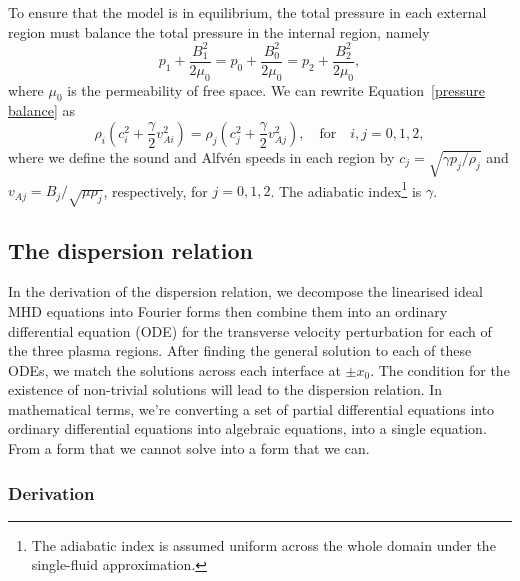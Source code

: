 \documentclass[12pt,draft]{../style-files/ociamthesis}
\begin{document}
To ensure that the model is in equilibrium, the total pressure in each external region must balance the total pressure in the internal region, namely
\begin{equation}
	p_1 + \frac{B_1^2}{2\mu_0} = p_0 + \frac{B_0^2}{2\mu_0} = p_2 + \frac{B_2^2}{2\mu_0}, \label{pressure balance}
\end{equation}
where $\mu_0$ is the permeability of free space. We can rewrite Equation~\eqref{pressure balance} as
\begin{equation}
\rho_i\left(c_i^2 + \frac{\gamma}{2}v_{Ai}^2\right) = \rho_j\left(c_j^2 + \frac{\gamma}{2}v_{Aj}^2\right), \quad \text{for} \quad i, j = 0, 1, 2, \label{sound and density}
\end{equation}
where we define the sound and Alfv\'{e}n speeds in each region by $c_j = \sqrt{\gamma p_j/\rho_j}$ and $v_{Aj} = B_j/\sqrt{\mu\rho_j}$, respectively, for $j = 0, 1, 2$. The adiabatic index\footnote{The adiabatic index is assumed uniform across the whole domain under the single-fluid approximation.} is $\gamma$.


\subsection{The dispersion relation}

In the derivation of the dispersion relation, we decompose the linearised ideal MHD equations into Fourier forms then combine them into an ordinary differential equation (ODE) for the transverse velocity perturbation for each of the three plasma regions. After finding the general solution to each of these ODEs, we match the solutions across each interface at $\pm x_0$. The condition for the existence of non-trivial solutions will lead to the dispersion relation. In mathematical terms, we're converting a set of partial differential equations into ordinary differential equations into algebraic equations, into a single equation. From a form that we cannot solve into a form that we can.


\subsubsection{Derivation} \label{sec: asym slab DR der}
\end{document}
